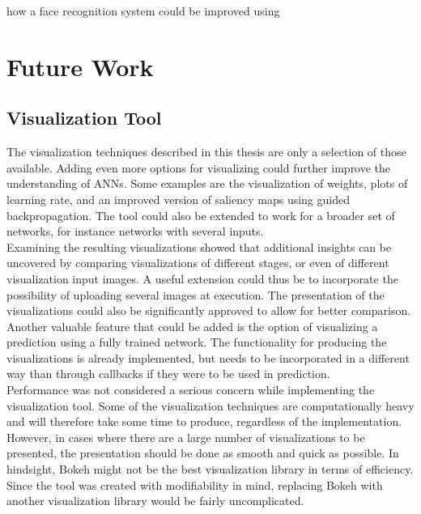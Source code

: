 how a face recognition system could be improved using

\section{Future Work} \label{future-work}

\subsection{Visualization Tool}

The visualization techniques described in this thesis are only a selection of those available. Adding even more options for visualizing could further improve the understanding of ANNs. Some examples are the visualization of weights, plots of learning rate, and an improved version of saliency maps using guided backpropagation. The tool could also be extended to work for a broader set of networks, for instance networks with several inputs. \\

\noindent Examining the resulting visualizations showed that additional insights can be uncovered by comparing visualizations of different stages, or even of different visualization input images. A useful extension could thus be to incorporate the possibility of uploading several images at execution. The presentation of the visualizations could also be significantly approved to allow for better comparison. Another valuable feature that could be added is the option of visualizing a prediction using a fully trained network. The functionality for producing the visualizations is already implemented, but needs to be incorporated in a different way than through callbacks if they were to be used in prediction.\\

\noindent Performance was not considered a serious concern while implementing the visualization tool. Some of the visualization techniques are computationally heavy and will therefore take some time to produce, regardless of the implementation. However, in cases where there are a large number of visualizations to be presented, the presentation should be done as smooth and quick as possible. In hindsight, Bokeh might not be the best visualization library in terms of efficiency. Since the tool was created with modifiability in mind, replacing Bokeh with another visualization library would be fairly uncomplicated. \\ 

